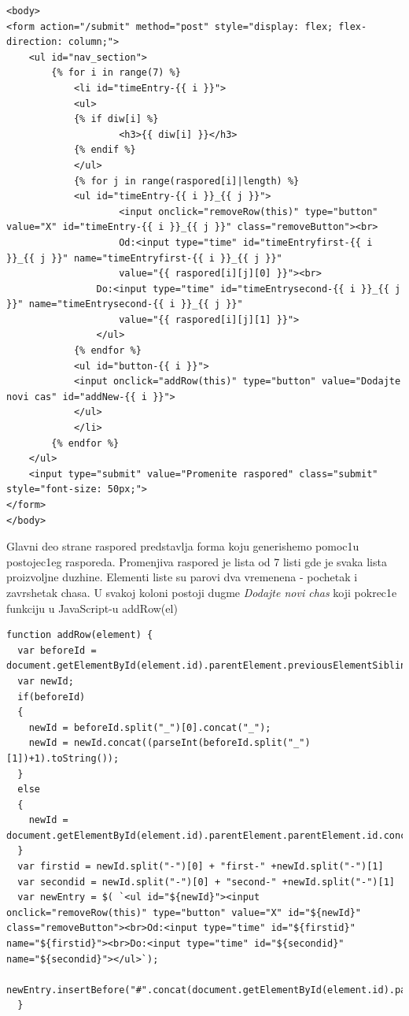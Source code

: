\documentclass[a4paper,fleqn,12pt]{JMThesis}
\newcommand{\latin}{\fontencoding{T1}\selectfont}
\theoremstyle{plain}
\theoremstyle{definition}
\begin{document}
{\latin
\begin{center}
\begin{lstlisting}[language=HTMLcaption={\latin raspored.html}]
<body>
<form action="/submit" method="post" style="display: flex; flex-direction: column;">
    <ul id="nav_section">
        {% for i in range(7) %}
            <li id="timeEntry-{{ i }}">
            <ul>
            {% if diw[i] %}
                    <h3>{{ diw[i] }}</h3>
            {% endif %}
            </ul>
            {% for j in range(raspored[i]|length) %}
            <ul id="timeEntry-{{ i }}_{{ j }}">
                    <input onclick="removeRow(this)" type="button" value="X" id="timeEntry-{{ i }}_{{ j }}" class="removeButton"><br>
                    Od:<input type="time" id="timeEntryfirst-{{ i }}_{{ j }}" name="timeEntryfirst-{{ i }}_{{ j }}"
                    value="{{ raspored[i][j][0] }}"><br>
                Do:<input type="time" id="timeEntrysecond-{{ i }}_{{ j }}" name="timeEntrysecond-{{ i }}_{{ j }}"
                    value="{{ raspored[i][j][1] }}">
                </ul>
            {% endfor %}    
            <ul id="button-{{ i }}">
            <input onclick="addRow(this)" type="button" value="Dodajte novi cas" id="addNew-{{ i }}">
            </ul>
            </li>
        {% endfor %}
    </ul>
    <input type="submit" value="Promenite raspored" class="submit" style="font-size: 50px;">
</form>
</body>
\end{lstlisting}
\end{center}
}
Glavni deo strane raspored predstavlja forma koju generishemo pomoc1u postojec1eg rasporeda. Promenjiva {\latin raspored} je lista od 7 listi gde je svaka lista proizvoljne duzhine. Elementi liste su parovi dva vremenena - pochetak i zavrshetak chasa. U svakoj koloni postoji dugme \textit{Dodajte novi chas} koji pokrec1e funkciju u {\latin JavaScript}-u {\latin addRow(el)}

{\latin
\begin{center}
\begin{lstlisting}[caption={\latin addRow(element)}]
function addRow(element) {
  var beforeId = document.getElementById(element.id).parentElement.previousElementSibling.id;
  var newId;
  if(beforeId)
  {
    newId = beforeId.split("_")[0].concat("_");
    newId = newId.concat((parseInt(beforeId.split("_")[1])+1).toString());
  }
  else
  {
    newId = document.getElementById(element.id).parentElement.parentElement.id.concat("_0");
  }
  var firstid = newId.split("-")[0] + "first-" +newId.split("-")[1]
  var secondid = newId.split("-")[0] + "second-" +newId.split("-")[1]
  var newEntry = $( `<ul id="${newId}"><input onclick="removeRow(this)" type="button" value="X" id="${newId}" class="removeButton"><br>Od:<input type="time" id="${firstid}" name="${firstid}"><br>Do:<input type="time" id="${secondid}" name="${secondid}"></ul>`);
  newEntry.insertBefore("#".concat(document.getElementById(element.id).parentElement.id))
  }
\end{lstlisting}
\end{center}
}
\end{document}
